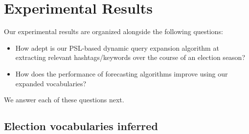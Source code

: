 \section{Experimental Results}
Our experimental results are organized alongside the following questions:
\begin{itemize}
\item How adept is our PSL-based dynamic query expansion algorithm at extracting relevant hashtags/keywords over the course
of an election season?
\item How does the performance of forecasting algorithms improve using our expanded vocabularies?
\end{itemize}
We answer each of these questions next.

\subsection{Election vocabularies inferred}

